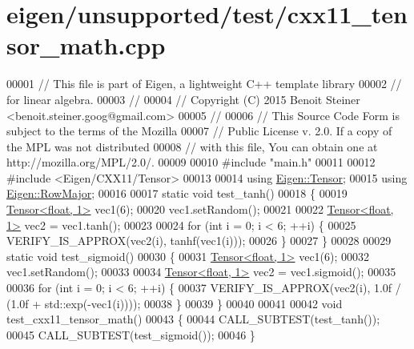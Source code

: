 \hypertarget{eigen_2unsupported_2test_2cxx11__tensor__math_8cpp_source}{}\section{eigen/unsupported/test/cxx11\+\_\+tensor\+\_\+math.cpp}
\label{eigen_2unsupported_2test_2cxx11__tensor__math_8cpp_source}

\begin{DoxyCode}
00001 \textcolor{comment}{// This file is part of Eigen, a lightweight C++ template library}
00002 \textcolor{comment}{// for linear algebra.}
00003 \textcolor{comment}{//}
00004 \textcolor{comment}{// Copyright (C) 2015 Benoit Steiner <benoit.steiner.goog@gmail.com>}
00005 \textcolor{comment}{//}
00006 \textcolor{comment}{// This Source Code Form is subject to the terms of the Mozilla}
00007 \textcolor{comment}{// Public License v. 2.0. If a copy of the MPL was not distributed}
00008 \textcolor{comment}{// with this file, You can obtain one at http://mozilla.org/MPL/2.0/.}
00009 
00010 \textcolor{preprocessor}{#include "main.h"}
00011 
00012 \textcolor{preprocessor}{#include <Eigen/CXX11/Tensor>}
00013 
00014 \textcolor{keyword}{using} \hyperlink{class_eigen_1_1_tensor}{Eigen::Tensor};
00015 \textcolor{keyword}{using} \hyperlink{group__enums_ggaacded1a18ae58b0f554751f6cdf9eb13acfcde9cd8677c5f7caf6bd603666aae3}{Eigen::RowMajor};
00016 
00017 \textcolor{keyword}{static} \textcolor{keywordtype}{void} test\_tanh()
00018 \{
00019   \hyperlink{class_eigen_1_1_tensor}{Tensor<float, 1>} vec1(6);
00020   vec1.setRandom();
00021 
00022   \hyperlink{class_eigen_1_1_tensor}{Tensor<float, 1>} vec2 = vec1.tanh();
00023 
00024   \textcolor{keywordflow}{for} (\textcolor{keywordtype}{int} i = 0; i < 6; ++i) \{
00025     VERIFY\_IS\_APPROX(vec2(i), tanhf(vec1(i)));
00026   \}
00027 \}
00028 
00029 \textcolor{keyword}{static} \textcolor{keywordtype}{void} test\_sigmoid()
00030 \{
00031   \hyperlink{class_eigen_1_1_tensor}{Tensor<float, 1>} vec1(6);
00032   vec1.setRandom();
00033 
00034   \hyperlink{class_eigen_1_1_tensor}{Tensor<float, 1>} vec2 = vec1.sigmoid();
00035 
00036   \textcolor{keywordflow}{for} (\textcolor{keywordtype}{int} i = 0; i < 6; ++i) \{
00037     VERIFY\_IS\_APPROX(vec2(i), 1.0f / (1.0f + std::exp(-vec1(i))));
00038   \}
00039 \}
00040 
00041 
00042 \textcolor{keywordtype}{void} test\_cxx11\_tensor\_math()
00043 \{
00044   CALL\_SUBTEST(test\_tanh());
00045   CALL\_SUBTEST(test\_sigmoid());
00046 \}
\end{DoxyCode}
